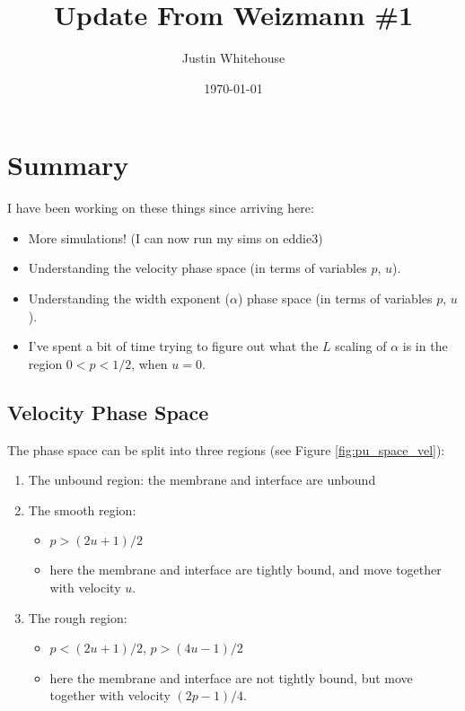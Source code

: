\documentclass[a4paper,10pt]{article}
\title{Update From Weizmann \#1}
\author{Justin Whitehouse}
\date{\today}
\newcommand{\fref}[1]{Figure \ref{#1}}
\begin{document}
\maketitle


\tableofcontents
\newpage


\section{Summary}

I have been working on these things since arriving here:

\begin{itemize}
 \item More simulations! (I can now run my sims on eddie3)
 \item Understanding the velocity phase space (in terms of variables $p$, $u$).
 \item Understanding the width exponent ($\alpha$) phase space (in terms of variables $p$, $u$).
 \item I've spent a bit of time trying to figure out what the $L$ scaling of $\alpha$ is in the region $0 < p < 1/2$, when $u=0$.
\end{itemize}

\subsection{Velocity Phase Space}

The phase space can be split into three regions (see \fref{fig:pu_space_vel}):
\begin{enumerate}
 \item The unbound region: the membrane and interface are unbound
 \item The smooth region: 
  \begin{itemize}
   \item $p > (2u+1)/2$
   \item here the membrane and interface are tightly bound, and move together with velocity $u$.
  \end{itemize}
 \item The rough region: 
  \begin{itemize}
   \item $p < (2u+1)/2$, $p > (4u -1)/2$
   \item here the membrane and interface are not tightly bound, but move together with velocity $(2p-1)/4$.
  \end{itemize}
\end{enumerate}
\end{document}
